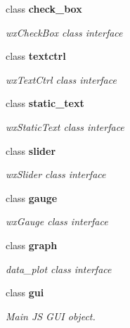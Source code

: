 \begin{DoxyCompactItemize}
class \textbf{ check\+\_\+box}
\begin{DoxyCompactList}\small\item\em wx\+Check\+Box class interface \end{DoxyCompactList}\item 
class \textbf{ textctrl}
\begin{DoxyCompactList}\small\item\em wx\+Text\+Ctrl class interface \end{DoxyCompactList}\item 
class \textbf{ static\+\_\+text}
\begin{DoxyCompactList}\small\item\em wx\+Static\+Text class interface \end{DoxyCompactList}\item 
class \textbf{ slider}
\begin{DoxyCompactList}\small\item\em wx\+Slider class interface \end{DoxyCompactList}\item 
class \textbf{ gauge}
\begin{DoxyCompactList}\small\item\em wx\+Gauge class interface \end{DoxyCompactList}\item 
class \textbf{ graph}
\begin{DoxyCompactList}\small\item\em data\+\_\+plot class interface \end{DoxyCompactList}\item 
class \textbf{ gui}
\begin{DoxyCompactList}\small\item\em Main JS G\+UI object. \end{DoxyCompactList}\end{DoxyCompactItemize}
